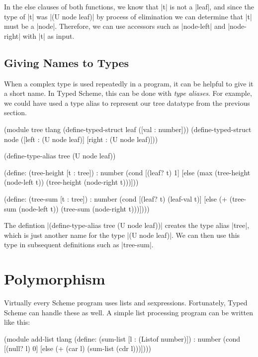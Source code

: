 \documentclass{book}
\begin{document}
\begin{schemeregion}
In the else clauses of both functions, we know that \scheme|t| is not
a \scheme|leaf|, and since the type of \scheme|t| was \scheme|(U node
leaf)| by process of elimination we can determine that \scheme|t| must
be a \scheme|node|.  Therefore, we can use accessors such as
\scheme|node-left| and \scheme|node-right| with \scheme|t| as input.

\section{Giving Names to Types}

When a complex type is used repeatedly in a program, it can be helpful
to give it a short name.  In Typed Scheme, this can be done with {\it
  type aliases}.  For example, we could have used a type alias to
represent our tree datatype from the previous section.

\begin{schemedisplay}
(module tree tlang
  (define-typed-struct leaf ([val : number]))
  (define-typed-struct node ([left : (U node leaf)] [right : (U node leaf)]))
  
  (define-type-alias tree (U node leaf))
  
  (define: (tree-height [t : tree]) : number
    (cond [(leaf? t) 1]
          [else (max (tree-height (node-left t))
                     (tree-height (node-right t)))]))
  
  (define: (tree-sum [t : tree]) : number
    (cond [(leaf? t) (leaf-val t)]
          [else (+ (tree-sum (node-left t))
                   (tree-sum (node-right t)))])))
\end{schemedisplay}

The defintion \scheme|(define-type-alias tree (U node leaf))| creates
the type alias \scheme|tree|, which is just another name for the type
\scheme|(U node leaf)|.  We can then use this type in subsequent
definitions such as \scheme|tree-sum|.

\chapter{Polymorphism}

Virtually every Scheme program uses lists and sexpressions.  Fortunately, Typed
Scheme can handle these as well.  A simple list processing program can be
written like this:

\begin{schemedisplay}
(module add-list tlang
  (define: (sum-list [l : (Listof number)]) : number
    (cond [(null? l) 0]
          [else (+ (car l) (sum-list (cdr l)))])))
\end{schemedisplay}


\end{schemeregion}
\end{document}
